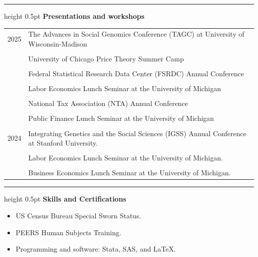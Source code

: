 \documentclass[a4paper,11pt]{article}
\newcommand{\CVSection}[1]{%
  \vspace{1.5em}
  \hrule height 0.5pt
  \vspace{0.8em}
  \noindent\textbf{#1}
  \vspace{0.5em}\par
}
\begin{document}
\CVSection{Presentations and workshops}
\begin{tabularx}{\linewidth}{@{}lX@{}}
2025 & The Advances in Social Genomics Conference (TAGC) at University of Wisconsin-Madison  \\
    & \\
    & University of Chicago Price Theory Summer Camp \\
    & \\ 
    & Federal Statistical Research Data Center (FSRDC) Annual Conference \\
    & \\
    & Labor Economics Lunch Seminar at the University of Michigan \\
    & \\ 
    & National Tax Association (NTA) Annual Conference \\
    & \\
    & Public Finance Lunch Seminar at the University of Michigan \\
    & \\
 2024    &  Integrating Genetics and the Social Sciences (IGSS) Annual Conference at Stanford University. \\
 & \\
         &  Labor Economics Lunch Seminar at the University of Michigan. \\ 
        & \\
         &  Business Economics Lunch Seminar at the University of Michigan.
\end{tabularx}

\CVSection{Skills and Certifications}

\begin{itemize}[leftmargin=*]
    \item US Census Bureau Special Sworn Status.
    \item PEERS Human Subjects Training.
    \item Programming and software: Stata, SAS, and \LaTeX. 
\end{itemize}


\end{document}
